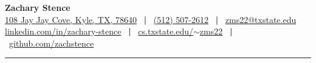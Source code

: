\documentclass[letterpaper, 10pt]{article}
\makeatletter
\newcommand{\ressubheading}[4]{
\begin{tabular*}{6.609in}{l@{\cftdotfill{\cftsecdotsep}\extracolsep{\fill}}r}
		\textbf{#1} & #2 \\
		\textit{#3} & #4 \\
\end{tabular*}\vspace{-6pt}}
\newcommand{\sep}{\ \textbf{|} \ }
\makeatother
\begin{document}


%
%


\textbf{\huge Zachary Stence} \\[2pt]
 \href{https://goo.gl/maps/NUGFEpNkauH2}{108 Jay Jay Cove, Kyle, TX, 78640} \sep \href{tel:15125072612}{(512) 507-2612} \sep \href{mailto:zms22@txstate.edu}{zms22@txstate.edu} \\
 \href{https://www.linkedin.com/in/zachary-stence}{linkedin.com/in/zachary-stence} \sep \href{http://cs.txstate.edu/~zms22}{cs.txstate.edu/$\sim$zms22} \sep \href{https://www.github.com/zachstence}{github.com/zachstence} \\[6pt]

\hrule

\vspace{2pt}

%
%



\end{document}

